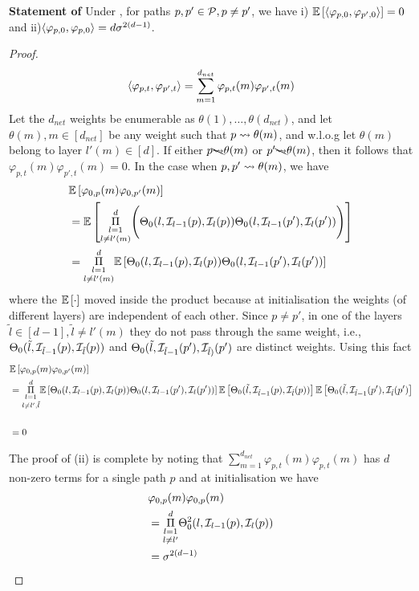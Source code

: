 \textbf{Statement of }
Under , for paths $p,p'\in \P, p\neq p'$, we have  i) $\E{\ip{\varphi_{p,0}, \varphi_{p',0}}}= 0$ and ii)${\ip{\varphi_{p,0}, \varphi_{p,0}}}= d\sigma^{2(d-1)}$.
\begin{proof}
\begin{align*}
\ip{\varphi_{p,t}, \varphi_{p',t}}= \sum_{m=1}^{d_{net}} \varphi_{p,t}(m)\varphi_{p',t}(m)
\end{align*}
Let the $d_{net}$ weights be enumerable as $\theta(1),\ldots,\theta(d_{net})$, and let $\theta(m),m\in[d_{net}]$ be any weight such that $p\rsa \theta(m)$, and w.l.o.g let $\theta(m)$ belong to layer $l'(m)\in[d]$. 
If either $p\bcancel{\rsa}\theta(m)$ or $p'\bcancel{\rsa}\theta(m)$, then it follows that $\varphi_{p,t}(m)\varphi_{p',t}(m)=0$. In the case when $p,p'\rsa\theta(m)$, we have
\begin{align*}
&\E{\varphi_{0,p}(m)\varphi_{0,p'}(m)}\\
&=\E{\underset{l\neq l'(m)}{\underset{l=1}{\overset{d}{\Pi}}} \Bigg(\Tb_0(l,\I_{l-1}(p),\I_l(p))\Tb_0(l,\I_{l-1}(p'),\I_l(p')) \Bigg)}\\
&=\underset{l\neq l'(m)}{\underset{l=1}{\overset{d}{\Pi}}}\E{\Tb_0(l,\I_{l-1}(p),\I_l(p))\Tb_0(l,\I_{l-1}(p'),\I_l(p'))}
\end{align*}
where the $\E{\cdot}$ moved inside the product because at initialisation the weights (of different layers) are independent of each other.
Since $p\neq p'$, in one of the layers $\tilde{l}\in[d-1],\tilde{l}\neq l'(m)$ they do not pass through the same weight, i.e., $\Tb_0(\tilde{l},\I_{\tilde{l}-1}(p),\I_{\tilde{l}}(p))$ and $\Tb_0(\tilde{l},\I_{\tilde{l}-1}(p'),\I_{\tilde{l})}(p')$ are distinct weights. Using this fact
\begin{align*}
&\E{\varphi_{0,p}(m)\varphi_{0,p'}(m)}\\
&=\underset{l\neq l',\tilde{l}}{\underset{l=1}{\overset{d}{\Pi}}}\E{\Tb_0(l,\I_{l-1}(p),\I_l(p))\Tb_0(l,\I_{l-1}(p'),\I_l(p'))}\E{\Tb_0(\tilde{l},\I_{\tilde{l}-1}(p),\I_{\tilde{l}}(p))}\E{\Tb_0(\tilde{l},\I_{\tilde{l}-1}(p'),\I_{\tilde{l}}(p')}\\\\
&=0
\end{align*}

The proof of (ii) is complete by noting that $\sum_{m=1}^{d_{net}} \varphi_{p,t}(m)\varphi_{p,t}(m)$ has $d$ non-zero terms for a single path $p$ and at initialisation we have 
\begin{align*}
&{\varphi_{0,p}(m)\varphi_{0,p}(m)}\\
&={\underset{l\neq l'}{\underset{l=1}{\overset{d}{\Pi}}} \Tb^2_0(l,\I_{l-1}(p),\I_l(p))}\\
&=\sigma^{2(d-1)}
\end{align*}
\end{proof}

